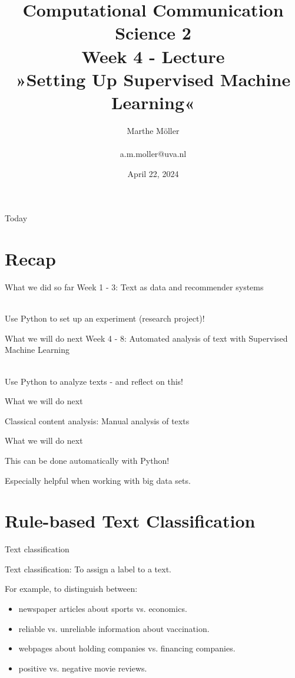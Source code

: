 \documentclass[compress]{beamer}
\title[Computational Communication Science 2]{\textbf{Computational Communication Science 2} \\Week 4 - Lecture\\ »Setting Up Supervised Machine Learning«}
\author[A. Marthe Möller]{Marthe Möller \\ ~ \\ \footnotesize{a.m.moller@uva.nl} \\}
\date{April 22, 2024}
\institute[Digital Society Minor, University of Amsterdam]{Digital Society Minor, University of Amsterdam}
\begin{document}
	
\begin{frame}{}
	\titlepage
\end{frame}
	
\begin{frame}{Today}
	\begin{tiny}
	\tableofcontents
	\end{tiny}
\end{frame}


\section{Recap}

\begin{frame}[fragile]{What we did so far}
Week 1 - 3: Text as data and recommender systems \\\

Use Python to set up an experiment (research project)!
\end{frame}

\begin{frame}[fragile]{What we will do next}
Week 4 - 8: Automated analysis of text with Supervised Machine Learning \\\

Use Python to analyze texts - and reflect on this!
\end{frame}


\begin{frame}[fragile]{What we will do next} 
	
Classical content analysis:	
Manual analysis of texts
\end{frame}

\begin{frame}[fragile]{What we will do next} 
	
This can be done automatically with Python!
	
Especially helpful when working with big data sets.
\end{frame}


\section{Rule-based Text Classification}

\begin{frame}[fragile]{Text classification}

Text classification: To assign a label to a text.

\pause
\normalsize

\begin{alertblock}{For example, to distinguish between:}
	\begin{itemize}
	\item newspaper articles about sports vs. economics.
	\item reliable vs. unreliable information about vaccination.
	\item webpages about holding companies vs. financing companies.
	\item positive vs. negative movie reviews.
\end{itemize}
\end{alertblock}
\end{frame}
\end{document}
